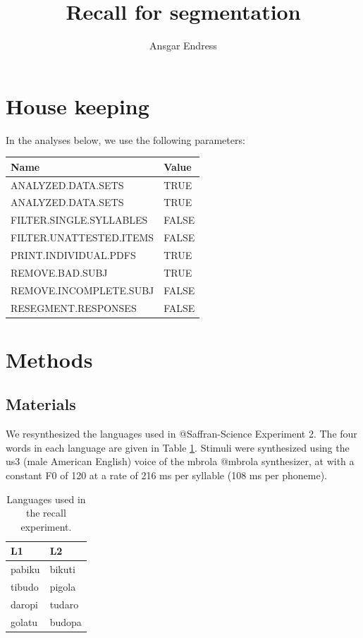 \documentclass[]{article}
\title{Recall for segmentation}
\author{Ansgar Endress}
\date{}
\begin{document}
\maketitle

{
\setcounter{tocdepth}{2}
\tableofcontents
}
\section{House keeping}\label{house-keeping}

In the analyses below, we use the following parameters:

\begin{longtable}[]{@{}ll@{}}
\toprule
Name & Value\tabularnewline
\midrule
\endhead
ANALYZED.DATA.SETS & TRUE\tabularnewline
ANALYZED.DATA.SETS & TRUE\tabularnewline
FILTER.SINGLE.SYLLABLES & FALSE\tabularnewline
FILTER.UNATTESTED.ITEMS & FALSE\tabularnewline
PRINT.INDIVIDUAL.PDFS & TRUE\tabularnewline
REMOVE.BAD.SUBJ & TRUE\tabularnewline
REMOVE.INCOMPLETE.SUBJ & FALSE\tabularnewline
RESEGMENT.RESPONSES & FALSE\tabularnewline
\bottomrule
\end{longtable}

\section{Methods}\label{methods}

\subsection{Materials}\label{materials}

We resynthesized the languages used in @Saffran-Science Experiment 2.
The four words in each language are given in Table
\ref{tab:recall-languages}. Stimuli were synthesized using the us3 (male
American English) voice of the mbrola @mbrola synthesizer, at with a
constant F0 of 120 at a rate of 216 ms per syllable (108 ms per
phoneme).

\begin{table}

\caption{\label{tab:recall-print-languages}\label{tab:recall-languages}Languages used in the recall experiment.}
\centering
\begin{tabular}[t]{ll}
\toprule
L1 & L2\\
\midrule
pabiku & bikuti\\
tibudo & pigola\\
daropi & tudaro\\
golatu & budopa\\
\bottomrule
\end{tabular}
\end{table}
\end{document}
